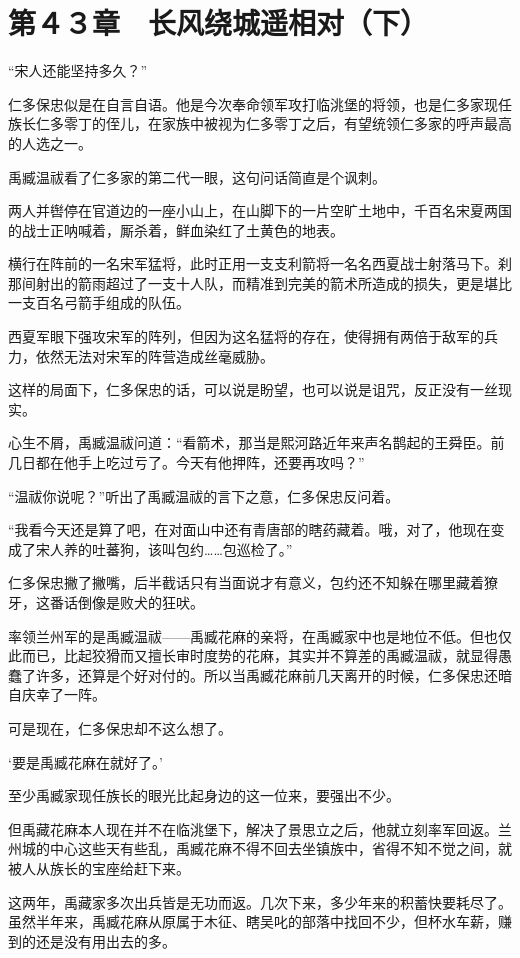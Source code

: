 \section{第４３章　长风绕城遥相对（下）}

“宋人还能坚持多久？”

仁多保忠似是在自言自语。他是今次奉命领军攻打临洮堡的将领，也是仁多家现任族长仁多零丁的侄儿，在家族中被视为仁多零丁之后，有望统领仁多家的呼声最高的人选之一。

禹臧温祓看了仁多家的第二代一眼，这句问话简直是个讽刺。

两人并辔停在官道边的一座小山上，在山脚下的一片空旷土地中，千百名宋夏两国的战士正呐喊着，厮杀着，鲜血染红了土黄色的地表。

横行在阵前的一名宋军猛将，此时正用一支支利箭将一名名西夏战士射落马下。刹那间射出的箭雨超过了一支十人队，而精准到完美的箭术所造成的损失，更是堪比一支百名弓箭手组成的队伍。

西夏军眼下强攻宋军的阵列，但因为这名猛将的存在，使得拥有两倍于敌军的兵力，依然无法对宋军的阵营造成丝毫威胁。

这样的局面下，仁多保忠的话，可以说是盼望，也可以说是诅咒，反正没有一丝现实。

心生不屑，禹臧温祓问道：“看箭术，那当是熙河路近年来声名鹊起的王舜臣。前几日都在他手上吃过亏了。今天有他押阵，还要再攻吗？”

“温祓你说呢？”听出了禹臧温祓的言下之意，仁多保忠反问着。

“我看今天还是算了吧，在对面山中还有青唐部的瞎药藏着。哦，对了，他现在变成了宋人养的吐蕃狗，该叫包约……包巡检了。”

仁多保忠撇了撇嘴，后半截话只有当面说才有意义，包约还不知躲在哪里藏着獠牙，这番话倒像是败犬的狂吠。

率领兰州军的是禹臧温祓——禹臧花麻的亲将，在禹臧家中也是地位不低。但也仅此而已，比起狡猾而又擅长审时度势的花麻，其实并不算差的禹臧温祓，就显得愚蠢了许多，还算是个好对付的。所以当禹臧花麻前几天离开的时候，仁多保忠还暗自庆幸了一阵。

可是现在，仁多保忠却不这么想了。

‘要是禹臧花麻在就好了。’

至少禹臧家现任族长的眼光比起身边的这一位来，要强出不少。

但禹藏花麻本人现在并不在临洮堡下，解决了景思立之后，他就立刻率军回返。兰州城的中心这些天有些乱，禹臧花麻不得不回去坐镇族中，省得不知不觉之间，就被人从族长的宝座给赶下来。

这两年，禹藏家多次出兵皆是无功而返。几次下来，多少年来的积蓄快要耗尽了。虽然半年来，禹臧花麻从原属于木征、瞎吴叱的部落中找回不少，但杯水车薪，赚到的还是没有用出去的多。

